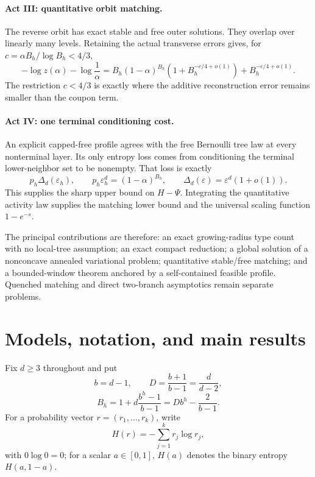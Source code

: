 \documentclass[11pt]{amsart}
\theoremstyle{definition}
\begin{document}
\paragraph{Act III: quantitative orbit matching.}
The reverse orbit has exact stable and free outer solutions.  They overlap over linearly many levels.  Retaining the actual transverse errors gives, for
$c=\alpha B_h/\log B_h<4/3$,
\[
 -\log z(\alpha)-\log\frac1\alpha
 =B_h(1-\alpha)^{B_h}
 \left(1+B_h^{-c/4+o(1)}\right)
 +B_h^{-c/4+o(1)}.
\]
The restriction $c<4/3$ is exactly where the additive reconstruction error remains smaller than the coupon term.

\paragraph{Act IV: one terminal conditioning cost.}
An explicit capped-free profile agrees with the free Bernoulli tree law at every nonterminal layer.  Its only entropy loss comes from conditioning the terminal lower-neighbor set to be nonempty.  That loss is exactly
\[
 p_h\Delta_d(\varepsilon_h),
 \qquad
 p_h\varepsilon_h^d=(1-\alpha)^{B_h},
 \qquad
 \Delta_d(\varepsilon)=\varepsilon^d(1+o(1)).
\]
This supplies the sharp upper bound on $H-\Psi$.  Integrating the quantitative activity law supplies the matching lower bound and the universal scaling function $1-e^{-s}$.

The principal contributions are therefore: an exact growing-radius type count with no local-tree assumption; an exact compact reduction; a global solution of a nonconcave annealed variational problem; quantitative stable/free matching; and a bounded-window theorem anchored by a self-contained feasible profile.  Quenched matching and direct two-branch asymptotics remain separate problems.

\section{Models, notation, and main results}\label{sec:main}
Fix $d\ge3$ throughout and put
\[
 b=d-1,\qquad D=\frac{b+1}{b-1}=\frac d{d-2},
\]
\begin{equation}\label{eq:Bh}
 B_h=1+d\frac{b^h-1}{b-1}=Db^h-\frac2{b-1}.
\end{equation}
For a probability vector $r=(r_1,\ldots,r_k)$, write
\[
 H(r)=-\sum_{j=1}^k r_j\log r_j,
\]
with $0\log0=0$; for a scalar $a\in[0,1]$, $H(a)$ denotes the binary entropy $H(a,1-a)$.
\end{document}
